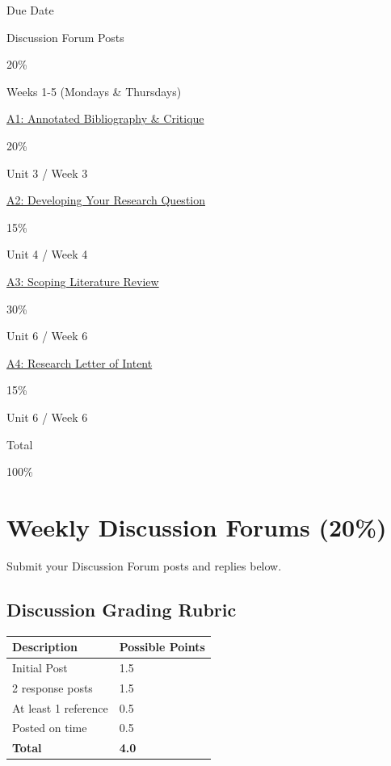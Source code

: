 \documentclass[
  letterpaper,
  DIV=11,
  numbers=noendperiod]{scrreprt}
\begin{document}
Due Date

Discussion Forum Posts

20\%

Weeks 1-5 (Mondays \& Thursdays)

\href{https://learn.twu.ca/mod/assign/view.php?id=1169688}{A1: Annotated
Bibliography \& Critique}

20\%

Unit 3 / Week 3

\href{https://learn.twu.ca/mod/assign/view.php?id=1169689}{A2:
Developing Your Research Question}

15\%

Unit 4 / Week 4

\href{https://learn.twu.ca/mod/assign/view.php?id=1169690}{A3: Scoping
Literature Review}

30\%

Unit 6 / Week 6

\href{https://learn.twu.ca/mod/assign/view.php?id=1169691}{A4: Research
Letter of Intent}

15\%

Unit 6 / Week 6

Total

100\%


\chapter{Weekly Discussion Forums
(20\%)}\label{weekly-discussion-forums-20}

Submit your Discussion Forum posts and replies below.

\section{Discussion Grading Rubric}\label{discussion-grading-rubric}

\begin{longtable}[]{@{}ll@{}}
\toprule\noalign{}
\textbf{Description} & \textbf{Possible Points} \\
\midrule\noalign{}
\endhead
\bottomrule\noalign{}
\endlastfoot
Initial Post & 1.5 \\
2 response posts & 1.5 \\
At least 1 reference & 0.5 \\
Posted on time & 0.5 \\
\textbf{Total} & \textbf{4.0} \\
\end{longtable}
\end{document}
